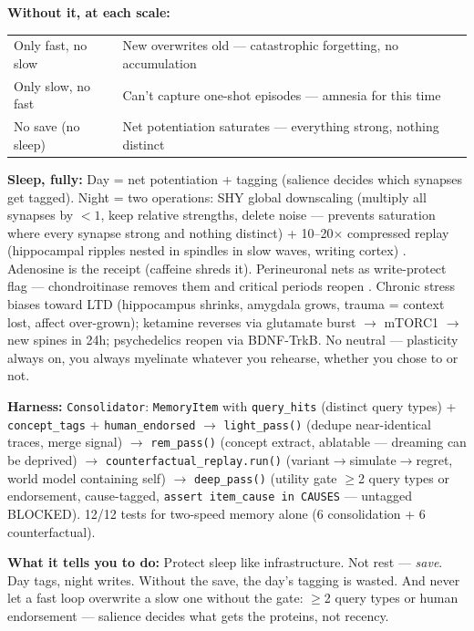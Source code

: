 \documentclass[11pt]{article}
\begin{document}
\textbf{Without it, at each scale:}

\begin{center}
\small
\begin{tabular}{p{2.6cm}p{6.2cm}}
\toprule
Only fast, no slow & New overwrites old --- catastrophic forgetting, no accumulation \\
Only slow, no fast & Can't capture one-shot episodes --- amnesia for this time \\
No save (no sleep) & Net potentiation saturates --- everything strong, nothing distinct \\
\bottomrule
\end{tabular}
\end{center}

\textbf{Sleep, fully:} Day = net potentiation + tagging (salience decides which synapses get tagged). Night = two operations: SHY global downscaling \citep{tononi2014} (multiply all synapses by $<1$, keep relative strengths, delete noise --- prevents saturation where every synapse strong and nothing distinct) + 10--20$\times$ compressed replay (hippocampal ripples nested in spindles in slow waves, writing cortex) \citep{tononi2014}. Adenosine is the receipt (caffeine shreds it). Perineuronal nets as write-protect flag --- chondroitinase removes them and critical periods reopen \citep{pizzorusso2002}. Chronic stress biases toward LTD (hippocampus shrinks, amygdala grows, trauma = context lost, affect over-grown); ketamine reverses via glutamate burst $\to$\allowbreak{} mTORC1 $\to$\allowbreak{} new spines in 24h; psychedelics reopen via BDNF-TrkB. No neutral --- plasticity always on, you always myelinate whatever you rehearse, whether you chose to or not.


\textbf{Harness:} \texttt{Consolidator}: \texttt{MemoryItem} with \texttt{query\_hits} (distinct query types) + \texttt{concept\_tags} + \texttt{human\_endorsed} $\to$\allowbreak{} \texttt{light\_pass()} (dedupe near-identical traces, merge signal) $\to$\allowbreak{} \texttt{rem\_pass()} (concept extract, ablatable --- dreaming can be deprived) $\to$\allowbreak{} \texttt{counterfactual\_\-replay.run()} (variant$\to$\allowbreak{}simulate$\to$\allowbreak{}regret, world model containing self) $\to$\allowbreak{} \texttt{deep\_pass()} (utility gate $\geq$2 query types or endorsement, cause-tagged, \texttt{assert item\_cause in CAUSES} --- untagged BLOCKED). 12/12 tests for two-speed memory alone (6 consolidation + 6 counterfactual).

\textbf{What it tells you to do:} Protect sleep like infrastructure. Not rest --- \emph{save}. Day tags, night writes. Without the save, the day's tagging is wasted. And never let a fast loop overwrite a slow one without the gate: $\geq$2 query types or human endorsement --- salience decides what gets the proteins, not recency.
\end{document}
